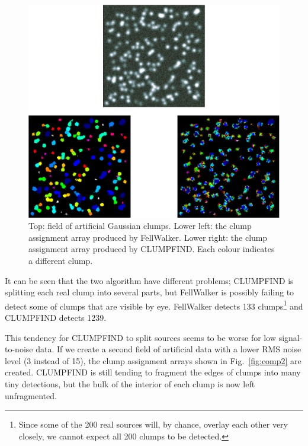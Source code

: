 \documentclass[final,authoryear,5p,times,twocolumn]{elsarticle}
\begin{document}
\begin{figure}
\includegraphics[width=\columnwidth]{comp1}
\caption{Top: field of artificial Gaussian clumps. Lower left: the clump
assignment array produced by FellWalker. Lower right: the clump assignment
array produced by CLUMPFIND. Each colour indicates a different clump. }
\label{fig:comp1}
\end{figure}

It can be seen that the two algorithm have different problems; CLUMPFIND
is splitting each real clump into several parts, but FellWalker is
possibly failing to detect some of clumps that are visible by eye. FellWalker
detects 133 clumps\footnote{Since some of the 200 real sources will, by
chance, overlay each other very closely, we cannot expect all 200 clumps
to be detected.} and CLUMPFIND detects 1239.

This tendency for CLUMPFIND to split sources seems to be worse for low
signal-to-noise data. If we create a second field of artificial data with
a lower RMS noise level (3 instead of 15), the clump assignment arrays
shown in Fig.~\ref{fig:comp2} are created. CLUMPFIND is still tending to
fragment the edges of clumps into many tiny detections, but the bulk of
the interior of each clump is now left unfragmented.
\end{document}
